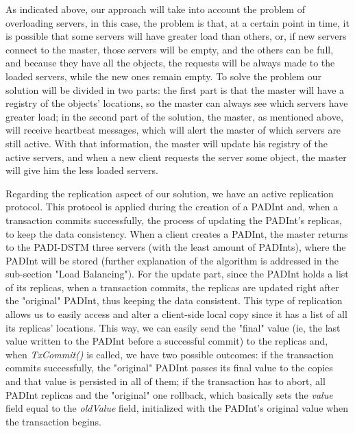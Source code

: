 \documentclass[times, 10pt,twocolumn]{article}
\begin{document}
As indicated above, our approach will take into account the problem of overloading servers, in this case, the problem is that, at a certain point in time, it is possible that some servers will have greater load than others, or, if new servers connect to the master, those servers will be empty, and the others can be full, and because they have all the objects, the requests will be always made to the loaded servers, while the new ones remain empty. To solve the problem our solution will be divided in two parts: the first part is that the master will have a registry of the objects' locations, so the master can always see which servers have greater load; in the second part of the solution, the master, as mentioned above, will receive heartbeat messages, which will alert the master of which servers are still active. With that information, the master will update his registry of the active servers, and when a new client requests the server some object, the master will give him the less loaded servers. 

Regarding the replication aspect of our solution, we have an active replication protocol. This protocol is applied during the creation of a PADInt and, when a transaction commits successfully, the process of updating the PADInt's replicas, to keep the data consistency.
When a client creates a PADInt, the master returns to the PADI-DSTM three servers (with the least amount of PADInts), where the PADInt will be stored (further explanation of the algorithm is addressed in the sub-section "Load Balancing"). For the update part, since the PADInt holds a list of its replicas, when a transaction commits, the replicas are updated right after the "original" PADInt, thus keeping the data consistent.
This type of replication allows us to easily access and alter a client-side local copy since it has a list of all its replicas' locations. This way, we can easily send the "final" value (ie, the last value written to the PADInt before a successful commit) to the replicas and, when \emph{TxCommit()} is called, we have two possible outcomes: if the transaction commits successfully, the "original" PADInt passes its final value to the copies and that value is persisted in all of them; if the transaction has to abort, all PADInt replicas and the "original" one rollback, which basically sets the \emph{value} field equal to the \emph{oldValue} field, initialized with the PADInt's original value when the transaction begins.

\end{document}
